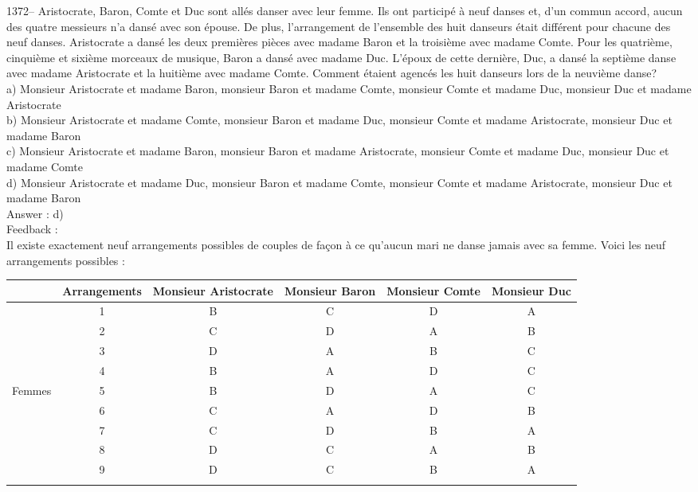 \documentclass[letterpaper, 12pt]{article}
\begin{document}
1372-- Aristocrate, Baron, Comte et Duc sont all\'es danser avec
leur femme. Ils ont particip\'e \`a neuf danses et, d'un commun
accord, aucun des quatre messieurs n'a dans\'e avec son \'epouse. De
plus, l'arrangement de l'ensemble des huit danseurs \'etait
diff\'erent pour chacune des neuf danses. Aristocrate a dans\'e les
deux premi\`eres pi\`eces avec madame Baron et la troisi\`eme avec
madame Comte. Pour les quatri\`eme, cinqui\`eme et sixi\`eme
morceaux de musique, Baron a dans\'e avec madame Duc.  L'\'epoux de
cette derni\`ere, Duc, a dans\'e la septi\`eme danse avec madame
Aristocrate et la huiti\`eme avec madame Comte.
Comment \'etaient agenc\'es les huit danseurs lors de la neuvi\`eme danse?\\
a) Monsieur Aristocrate et madame Baron, monsieur Baron et madame Comte,
monsieur Comte et madame Duc, monsieur Duc et madame Aristocrate\\
b) Monsieur Aristocrate et madame Comte, monsieur Baron et madame Duc,
monsieur Comte et madame Aristocrate, monsieur Duc et madame Baron\\
c) Monsieur Aristocrate et madame Baron, monsieur Baron et madame
Aristocrate, monsieur Comte et madame Duc, monsieur Duc et madame Comte\\
d) Monsieur Aristocrate et madame Duc, monsieur Baron et madame Comte,
monsieur Comte et madame Aristocrate, monsieur Duc et madame Baron\\

Answer : d)\\

Feedback : \\
Il existe exactement neuf arrangements possibles de couples de fa\c con \`a
ce qu'aucun mari ne danse jamais avec sa femme.  Voici les neuf arrangements
possibles :  \\
\begin{tabular}{|c|c|c|c|c|c|}
\hline
        &  Arrangements   & Monsieur Aristocrate & Monsieur Baron & Monsieur
Comte & Monsieur Duc    \\ \hline \hline
        &   1             & B           & C     & D      & A      \\
\cline{2-6}
        &   2             & C           & D     & A      & B      \\
\cline{2-6}
        &   3             & D           & A     & B      & C      \\
\cline{2-6}
        &   4             & B           & A     & D      & C      \\
\cline{2-6}
Femmes  &   5             & B           & D     & A      & C      \\
\cline{2-6}
        &   6             & C           & A     & D      & B      \\
\cline{2-6}
        &   7             & C           & D     & B      & A      \\
\cline{2-6}
        &   8             & D           & C     & A      & B      \\
\cline{2-6}
        &   9             & D           & C     & B      & A      \\ \hline
\multicolumn{6}{c}{}\\
\end{tabular}\\
\end{document}
